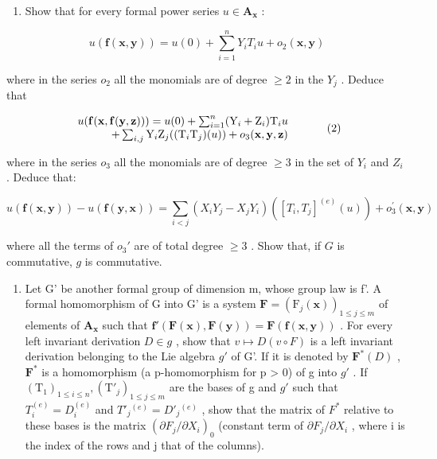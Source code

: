 \begin{enumerate}
\def\labelenumi{(\alph{enumi})}
\setcounter{enumi}{2}
\tightlist
\item
  Show that for every formal power series \(u \in \mathbf{A}_{\mathbf{x}}\) :
\end{enumerate}

\[
u (\mathbf {f} (\mathbf {x}, \mathbf {y})) = u (0) + \sum_ {i = 1} ^ {n} Y _ {i} T _ {i} u + o _ {2} (\mathbf {x}, \mathbf {y})\tag{1}
\]

where in the series \(o_{2}\) all the monomials are of degree \(\geqslant2\) in the \(Y_{j}\) . Deduce that

\[
\begin{array}{r l} {u (\mathbf {f} (\mathbf {x}, \mathbf {f} (\mathbf {y}, \mathbf {z}))) = u (0) + \sum_ {i = 1} ^ {n} (\mathrm{Y} _ {i} + \mathrm{Z} _ {i}) \mathrm{T} _ {i} u} & \\ {+ \sum_ {i, j} \mathrm{Y} _ {i} \mathrm{Z} _ {j} ((\mathrm{T} _ {i} \mathrm{T} _ {j}) (u)) + o _ {3} (\mathbf {x}, \mathbf {y}, \mathbf {z})} & \end{array}\tag{2}
\]

where in the series \(o_{3}\) all the monomials are of degree \(\geqslant3\) in the set of \(Y_{i}\) and \(Z_{i}\) . Deduce that:

\[
u (\mathbf {f} (\mathbf {x}, \mathbf {y})) - u (\mathbf {f} (\mathbf {y}, \mathbf {x})) = \sum_ {i <   j} (X _ {i} Y _ {j} - X _ {j} Y _ {i}) ([ T _ {i}, T _ {j} ] ^ {(e)} (u)) + o _ {3} ^ {\prime} (\mathbf {x}, \mathbf {y})\tag{3}
\]

where all the terms of \(o_3'\) are of total degree \(\geqslant 3\) . Show that, if \(G\) is commutative, \(g\) is commutative.

\begin{enumerate}
\def\labelenumi{(\alph{enumi})}
\setcounter{enumi}{3}
\tightlist
\item
  Let G' be another formal group of dimension m, whose group law is f'. A formal homomorphism of G into G' is a system \(\mathbf{F} = (\mathrm{F}_{j}(\mathbf{x}))_{1 \leqslant j \leqslant m}\) of elements of \(\mathbf{A}_{\mathbf{x}}\) such that \(\mathbf{f}'(\mathbf{F}(\mathbf{x}), \mathbf{F}(\mathbf{y})) = \mathbf{F}(\mathbf{f}(\mathbf{x}, \mathbf{y}))\) . For every left invariant derivation \(D \in g\) , show that \(v \mapsto D(v \circ F)\) is a left invariant derivation belonging to the Lie algebra \(g'\) of G'. If it is denoted by \(\mathbf{F}^*(D)\) , \(\mathbf{F}^*\) is a homomorphism (a p-homomorphism for p \textgreater{} 0) of g into \(g'\) . If \((\mathrm{T}_{1})_{1 \leqslant i \leqslant n}, (\mathrm{T}'_{j})_{1 \leqslant j \leqslant m}\) are the bases of g and \(g'\) such that \(T_{i}^{(e)} = D_{i}^{(e)}\) and \(T'_{j}{}^{(e)} = D'_{j}{}^{(e)}\) , show that the matrix of \(F^*\) relative to these bases is the matrix \((\partial F_{j}/\partial X_{i})_{0}\) (constant term of \(\partial F_{j}/\partial X_{i}\) , where i is the index of the rows and j that of the columns).
\end{enumerate}

